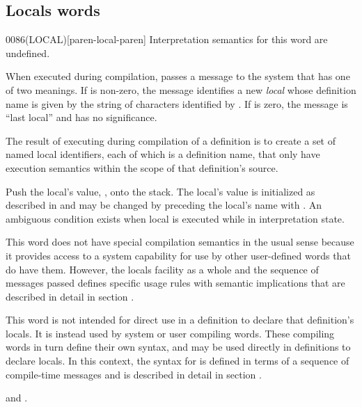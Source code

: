 \subsection{Locals words} %

\begin{worddef}[LOCAL]{0086}{(LOCAL)}[paren-local-paren]
\interpret
	Interpretation semantics for this word are undefined.

\execute

	When executed during compilation,  passes a
	message to the system that has one of two meanings. If 
	is non-zero, the message identifies a new \emph{local} whose
	definition name is given by the string of characters identified
	by . If  is zero, the message is ``last
	local'' and  has no significance.

	The result of executing  during compilation of a
	definition is to create a set of named local identifiers, each
	of which is a definition name, that only have execution
	semantics within the scope of that definition's source.

\execute[local]

	Push the local's value, , onto the stack. The local's
	value is initialized as described in  and may be changed by preceding the local's
	name with . An ambiguous condition exists when local is
	executed while in interpretation state.

\cbstart
{} 
\cbend


\note
	This word does not have special compilation semantics in the
	usual sense because it provides access to a system capability
	for use by other user-defined words that do have them. However,
	the locals facility as a whole and the sequence of messages
	passed defines specific usage rules with semantic implications
	that are described in detail in section
	.

\note
	This word is not intended for direct use in a definition to
	declare that definition's locals. It is instead used by system
	or user compiling words. These compiling words in turn define
	their own syntax, and may be used directly in definitions to
	declare locals. In this context, the syntax for 
	is defined in terms of a sequence of compile-time messages and
	is described in detail in section .

\cbstart
{} 
\cbend


\see {} and
	.
\end{worddef}


